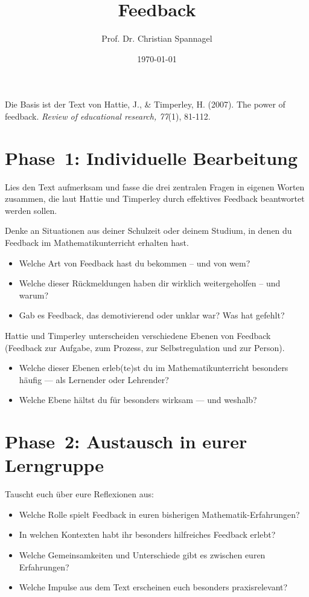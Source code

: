 \documentclass{cssheet}
\title{Feedback}
\author{Prof. Dr. Christian Spannagel}
\date{\today}
\begin{document}
\printtitle

Die Basis ist der Text von Hattie, J., \& Timperley, H. (2007). The power of feedback. \emph{Review of educational research, 77}(1), 81-112.

\section*{Phase~1: Individuelle Bearbeitung}

\begin{aufgabe}
Lies den Text aufmerksam und fasse die drei zentralen Fragen in eigenen Worten zusammen, die laut Hattie und Timperley durch effektives Feedback beantwortet werden sollen.
\end{aufgabe}

\begin{aufgabe}
Denke an Situationen aus deiner Schulzeit oder deinem Studium, in denen du Feedback im Mathematikunterricht erhalten hast.
\begin{itemize}
\item Welche Art von Feedback hast du bekommen – und von wem?
\item Welche dieser Rückmeldungen haben dir wirklich weitergeholfen – und warum?
\item Gab es Feedback, das demotivierend oder unklar war? Was hat gefehlt?
\end{itemize}
\end{aufgabe}

\begin{aufgabe}
Hattie und Timperley unterscheiden verschiedene Ebenen von Feedback (Feedback zur Aufgabe, zum Prozess, zur Selbstregulation und zur Person).
\begin{itemize}
\item Welche dieser Ebenen erleb(te)st du im Mathematikunterricht besonders häufig --- als Lernender oder Lehrender?
\item Welche Ebene hältst du für besonders wirksam --- und weshalb?
\end{itemize}
\end{aufgabe}

\section*{Phase~2: Austausch in eurer Lerngruppe}

\begin{aufgabe}
Tauscht euch über eure Reflexionen aus:
\begin{itemize}
\item Welche Rolle spielt Feedback in euren bisherigen Mathematik-Erfahrungen?
\item In welchen Kontexten habt ihr besonders hilfreiches Feedback erlebt?
\item Welche Gemeinsamkeiten und Unterschiede gibt es zwischen euren Erfahrungen?
\item Welche Impulse aus dem Text erscheinen euch besonders praxisrelevant?
\end{itemize}
\end{aufgabe}

\newpage
\printlicense

\printsocials
\end{document}
